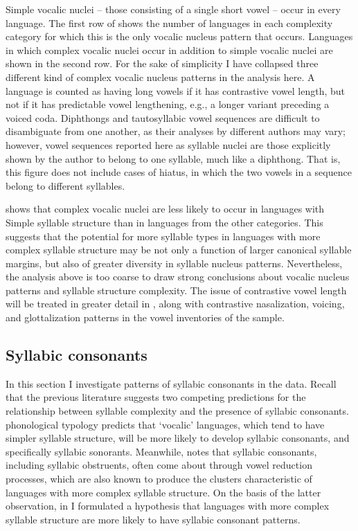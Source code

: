   Simple vocalic nuclei -- those consisting of a single short vowel -- occur in every language. The first row of  shows the number of languages in each complexity category for which this is the only vocalic nucleus pattern that occurs. Languages in which complex vocalic nuclei occur in addition to simple vocalic nuclei are shown in the second row. For the sake of simplicity I have collapsed three different kind of complex vocalic nucleus patterns in the analysis here. A language is counted as having long vowels if it has contrastive vowel length, but not if it has predictable vowel lengthening, e.g., a longer variant preceding a voiced coda. Diphthongs and tautosyllabic vowel sequences are difficult to disambiguate from one another, as their analyses by different authors may vary; however, vowel sequences reported here as syllable nuclei are those explicitly shown by the author to belong to one syllable, much like a diphthong. That is, this figure does not include cases of hiatus, in which the two vowels in a sequence belong to different syllables.

   shows that complex vocalic nuclei are less likely to occur in languages with Simple syllable structure than in languages from the other categories. This suggests that the potential for more syllable types in languages with more complex syllable structure may be not only a function of larger canonical syllable margins, but also of greater diversity in syllable nucleus patterns. Nevertheless, the analysis above is too coarse to draw strong conclusions about vocalic nucleus patterns and syllable structure complexity. The issue of contrastive vowel length will be treated in greater detail in , along with contrastive nasalization, voicing, and glottalization patterns in the vowel inventories of the sample.

\subsection{Syllabic consonants}\label{sec:3.3.5}

  In this section I investigate patterns of syllabic consonants in the data. Recall that the previous literature suggests two competing predictions for the relationship between syllable complexity and the presence of syllabic consonants.  phonological typology predicts that ‘vocalic’ languages, which tend to have simpler syllable structure, will be more likely to develop syllabic consonants, and specifically syllabic sonorants. Meanwhile, \citet{Bell1978a} notes that syllabic consonants, including syllabic obstruents, often come about through vowel reduction processes, which are also known to produce the clusters characteristic of languages with more complex syllable structure. On the basis of the latter observation, in  I formulated a hypothesis that languages with more complex syllable structure are more likely to have syllabic consonant patterns.

